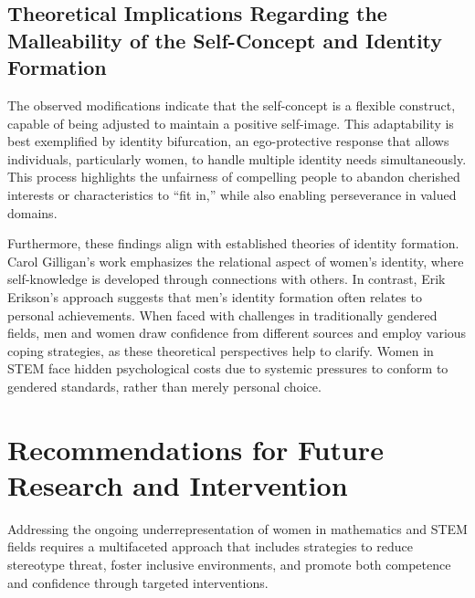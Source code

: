 \subsection{Theoretical Implications Regarding the Malleability of the Self-Concept and Identity Formation}
The observed modifications indicate that the self-concept is a flexible construct, capable of being adjusted to maintain a positive self-image. This adaptability is best exemplified by identity bifurcation, an ego-protective response that allows individuals, particularly women, to handle multiple identity needs simultaneously. This process highlights the unfairness of compelling people to abandon cherished interests or characteristics to ``fit in,'' while also enabling perseverance in valued domains.

Furthermore, these findings align with established theories of identity formation. Carol Gilligan's work emphasizes the relational aspect of women's identity, where self-knowledge is developed through connections with others. In contrast, Erik Erikson's approach suggests that men's identity formation often relates to personal achievements. When faced with challenges in traditionally gendered fields, men and women draw confidence from different sources and employ various coping strategies, as these theoretical perspectives help to clarify. Women in STEM face hidden psychological costs due to systemic pressures to conform to gendered standards, rather than merely personal choice. 

\section{Recommendations for Future Research and Intervention}
Addressing the ongoing underrepresentation of women in mathematics and STEM fields requires a multifaceted approach that includes strategies to reduce stereotype threat, foster inclusive environments, and promote both competence and confidence through targeted interventions.
